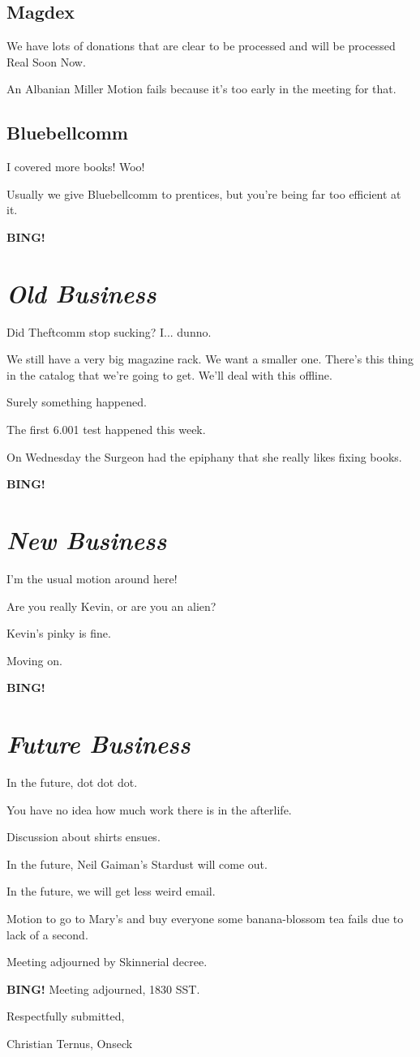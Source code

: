 \documentclass[10pt]{article}
\newcommand{\bing}{{\bf BING!} }
\newcommand{\goto}[1]{\bing \vskip 12pt \section*{{\em{#1}}}}
\begin{document}
\subsection*{Magdex}

We have lots of donations that are clear to be processed and will be processed Real Soon Now.

An Albanian Miller Motion fails because it's too early in the meeting for that.

\subsection*{Bluebellcomm}

I covered more books!  Woo!

Usually we give Bluebellcomm to prentices, but you're being far too efficient at it.


\goto{Old Business}

Did Theftcomm stop sucking?  I... dunno. 

We still have a very big magazine rack.  We want a smaller one.  There's this thing in the catalog that we're going to get.
We'll deal with this offline.

Surely something happened.

The first 6.001 test happened this week.

On Wednesday the Surgeon had the epiphany that she really likes fixing books. 

\goto{New Business}

I'm the usual motion around here!

Are you really Kevin, or are you an alien?

Kevin's pinky is fine.

Moving on.

\goto{Future Business}

In the future, dot dot dot.

You have no idea how much work there is in the afterlife.

Discussion about shirts ensues.

In the future, Neil Gaiman's Stardust will come out.

In the future, we will get less weird email.

Motion to go to Mary's and buy everyone some banana-blossom tea fails due to lack of a second.

Meeting adjourned by Skinnerial decree.

\bing
\noindent
Meeting adjourned, 1830 SST.

\vspace{18pt}

\centerline{Respectfully submitted,}
\centerline{Christian Ternus, Onseck}
\end{document}
